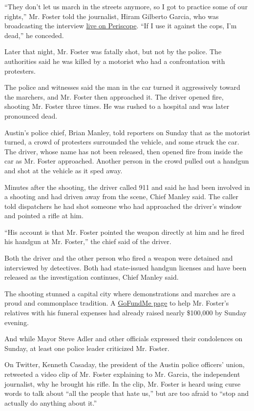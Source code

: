 ``They don't let us march in the streets anymore, so I got to practice
some of our rights,'' Mr. Foster told the journalist, Hiram Gilberto
Garcia, who was broadcasting the interview
\href{https://www.pscp.tv/w/1YqJDpVaEPDJV}{live on Periscope}. ``If I
use it against the cops, I'm dead,'' he conceded.

Later that night, Mr. Foster was fatally shot, but not by the police.
The authorities said he was killed by a motorist who had a confrontation
with protesters.

The police and witnesses said the man in the car turned it aggressively
toward the marchers, and Mr. Foster then approached it. The driver
opened fire, shooting Mr. Foster three times. He was rushed to a
hospital and was later pronounced dead.

Austin's police chief, Brian Manley, told reporters on Sunday that as
the motorist turned, a crowd of protesters surrounded the vehicle, and
some struck the car. The driver, whose name has not been released, then
opened fire from inside the car as Mr. Foster approached. Another person
in the crowd pulled out a handgun and shot at the vehicle as it sped
away.

Minutes after the shooting, the driver called 911 and said he had been
involved in a shooting and had driven away from the scene, Chief Manley
said. The caller told dispatchers he had shot someone who had approached
the driver's window and pointed a rifle at him.

``His account is that Mr. Foster pointed the weapon directly at him and
he fired his handgun at Mr. Foster,'' the chief said of the driver.

Both the driver and the other person who fired a weapon were detained
and interviewed by detectives. Both had state-issued handgun licenses
and have been released as the investigation continues, Chief Manley
said.

The shooting stunned a capital city where demonstrations and marches are
a proud and commonplace tradition. A
\href{https://www.gofundme.com/f/official-garrett-foster-memorial-fund}{GoFundMe
page} to help Mr. Foster's relatives with his funeral expenses had
already raised nearly \$100,000 by Sunday evening.

And while Mayor Steve Adler and other officials expressed their
condolences on Sunday, at least one police leader criticized Mr. Foster.

On Twitter, Kenneth Casaday, the president of the Austin police
officers' union, retweeted a video clip of Mr. Foster explaining to Mr.
Garcia, the independent journalist, why he brought his rifle. In the
clip, Mr. Foster is heard using curse words to talk about ``all the
people that hate us,'' but are too afraid to ``stop and actually do
anything about it.''

